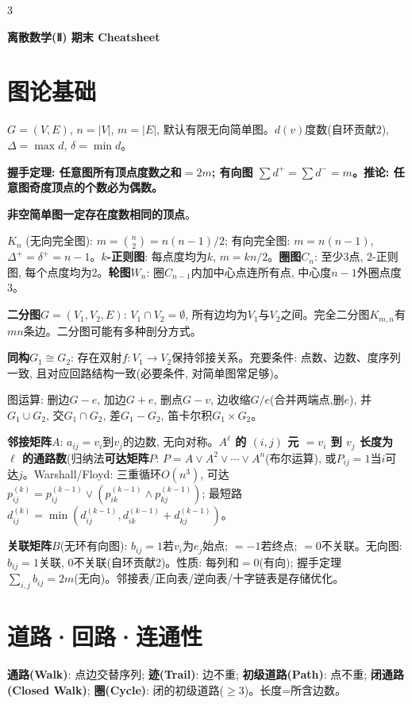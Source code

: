 \documentclass[4.5pt,landscape]{extarticle}
\newcommand{\rd}[1]{\textcolor{rd}{\textbf{#1}}}
\newcommand{\bu}[1]{\textcolor{bu}{\textbf{#1}}}
\newcommand{\xt}[1]{\textbf{#1}}
\begin{document}
\begin{multicols*}{3}
{\centering\xt{\large 离散数学(Ⅱ) 期末 Cheatsheet}\par\vspace{0pt}}

\section{图论基础}
$G=(V,E)$, $n=|V|$, $m=|E|$, 默认有限无向简单图。$d(v)$度数(自环贡献2), $\Delta=\max d$, $\delta=\min d$。

\rd{握手定理: 任意图所有顶点度数之和$=2m$; 有向图 $\sum d^+=\sum d^-=m$。}\rd{推论: 任意图奇度顶点的个数必为偶数。}

\rd{非空简单图一定存在度数相同的顶点}。

$K_n$ (无向完全图): $m=\binom n2=n(n-1)/2$; 有向完全图: $m=n(n-1)$, $\Delta^+=\delta^+=n-1$。\xt{$k$-正则图}: 每点度均为$k$, $m=kn/2$。\xt{圈图$C_n$}: 至少3点, 2-正则图, 每个点度均为2。\xt{轮图$W_n$}: 圈$C_{n-1}$内加中心点连所有点, 中心度$n-1$外圈点度3。

\xt{二分图$G=(V_1,V_2,E)$}: $V_1\cap V_2=\emptyset$, 所有边均为$V_1$与$V_2$之间。完全二分图$K_{m,n}$有$mn$条边。二分图可能有多种剖分方式。

\xt{同构$G_1\cong G_2$}: 存在双射$f:V_1\to V_2$保持邻接关系。充要条件: 点数、边数、度序列一致, 且对应回路结构一致(必要条件, 对简单图常足够)。

图运算: 删边$G-e$, 加边$G+e$, 删点$G-v$, 边收缩$G/e$(合并两端点,删$e$), 并$G_1\cup G_2$, 交$G_1\cap G_2$, 差$G_1-G_2$, 笛卡尔积$G_1\times G_2$。

\xt{邻接矩阵$A$}: $a_{ij}=v_i$到$v_j$的边数, 无向对称。\bu{$A^\ell$ 的 $(i,j)$ 元 $=v_i$ 到 $v_j$ 长度为 $\ell$ 的通路数}(归纳法\xt{可达矩阵$P$}: $P=A\vee A^2\vee\cdots\vee A^n$(布尔运算), 或$P_{ij}=1$当$i$可达$j$。Warshall/Floyd: 三重循环$O(n^3)$, 可达$p_{ij}^{(k)}=p_{ij}^{(k-1)}\vee(p_{ik}^{(k-1)}\wedge p_{kj}^{(k-1)})$; 最短路$d_{ij}^{(k)}=\min(d_{ij}^{(k-1)},d_{ik}^{(k-1)}+d_{kj}^{(k-1)})$。

\xt{关联矩阵$B$}(无环有向图): $b_{ij}=1$若$v_i$为$e_j$始点; $=-1$若终点; $=0$不关联。无向图: $b_{ij}=1$关联, $0$不关联(自环贡献2)。性质: 每列和$=0$(有向); 握手定理$\sum_{i,j}b_{ij}=2m$(无向)。邻接表/正向表/逆向表/十字链表是存储优化。

\section{道路·回路·连通性}
\xt{通路(Walk)}: 点边交替序列; \xt{迹(Trail)}: 边不重; \xt{初级道路(Path)}: 点不重; \xt{闭通路(Closed Walk)}; \xt{圈(Cycle)}: 闭的初级道路($\geq3$)。长度=所含边数。


\end{multicols*}
\end{document}
